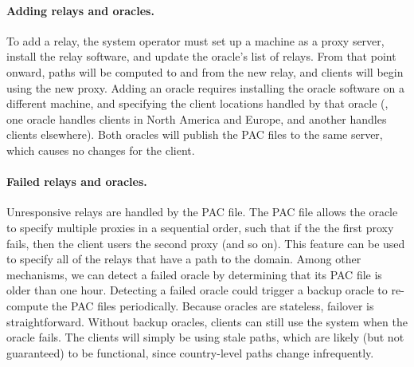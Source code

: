 \paragraph{Adding relays and oracles.} To add a relay, the system
operator must set up a machine as a proxy server, install the relay
software, and update the oracle's list of relays.  From that point
onward, paths will be computed to and from the new relay, and clients
will begin using the new proxy.  Adding an oracle requires installing
the oracle software on a different machine, and specifying the client
locations handled by that oracle (\eg, one oracle handles clients in
North America and Europe, and another handles clients elsewhere).
Both oracles will publish the PAC files to the same server, which
causes no changes for the client.

\paragraph{Failed relays and oracles.} Unresponsive relays are handled
by the PAC file.  The PAC file allows the oracle to specify multiple
proxies in a sequential order, such that if the the first proxy fails,
then the client users the second proxy (and so on).  This feature can
be used to specify all of the relays that have a path to the domain.
Among other mechanisms, we can detect a failed oracle by determining
that its PAC file is older than one hour.  Detecting a failed oracle
could trigger a backup oracle to re-compute the PAC files
periodically.  Because oracles are stateless, failover is
straightforward.  Without backup oracles, clients can still use the
system when the oracle fails.  The clients will simply be using stale
paths, which are likely (but not guaranteed) to be functional, since
country-level paths change infrequently.


